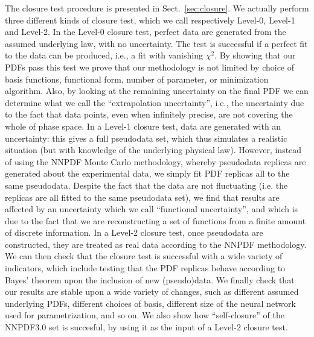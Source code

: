The closure test procedure is presented in
Sect.~\ref{sec:closure}. We actually perform three different kinds of
closure test, which we call respectively Level-0, Level-1 and
Level-2. In the Level-0 closure test, perfect data are generated from
the assumed underlying law, with  no uncertainty. The test is
successful if a perfect fit to the data can be produced, i.e., a fit
with vanishing $\chi^2$. By showing that our PDFs pass this test we
prove that our methodology is not limited by choice of basis
functions, functional
form, number of parameter, or minimization algorithm. Also, by looking
at the remaining uncertainty on the final PDF we can determine what we
call the ``extrapolation uncertainty'', i.e., the uncertainty due to
the fact that data points, even when infinitely precise, are not
covering the whole of phase space. In a Level-1 closure test, data
are generated with an uncertainty: this gives a full pseudodata set,
which  thus simulates a realistic
situation (but with knowledge of the underlying physical law). 
However, instead of using the NNPDF Monte Carlo methodology, whereby
pseudodata replicas are generated about the experimental data, we
simply fit PDF replicas all to the same pseudodata. Despite the fact
that the data are not fluctuating (i.e. the replicas are all fitted to
the same pseudodata set), we find that results are affected by an
uncertainty which we call  ``functional uncertainty'', and which is
due to the fact that we are reconstructing a set of functions from a
finite amount of discrete information. In a Level-2 closure test, once
pseudodata are constructed, they are treated as real data according to
the NNPDF methodology. We can then check that the closure test is
successful with a wide variety of indicators, which include
testing that the PDF replicas behave according to Bayes'
theorem upon the inclusion of new (pseudo)data. We finally check that
our results are stable upon a wide variety of changes, such as different
assumed underlying PDFs, different choices of basis, different size of
the neural network used for parametrization, and so on. 
%
We also show how ``self-closure'' of the NNPDF3.0 set is succesful,
by using it as the input of a Level-2 closure test.

